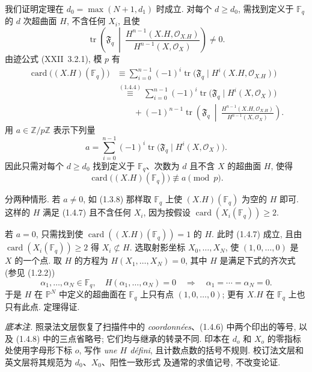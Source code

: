 我们证明定理在 $d_0=\max(N+1,d_1)$ 时成立. 对每个 $d\geq d_0$,
需找到定义于 $\mathbb F_q$ 的 $d$ 次超曲面 $H$, 不含任何 $X_i$, 且使
\begin{equation}\tag{1.4.5}
\operatorname{tr}\!\left(\mathfrak F_q\ \middle|\
\frac{H^{n-1}(X.H,\mathcal O_{X.H})}
     {H^{n-1}(X,\mathcal O_X)}\right)\ne0.
\end{equation}
由迹公式 (XXII~3.2.1), 模 $p$ 有
\begin{equation}\tag{1.4.6}
\begin{aligned}
\operatorname{card}\bigl((X.H)(\mathbb F_q)\bigr)
&\equiv\sum_{i=0}^{n-1}(-1)^i
 \operatorname{tr}\bigl(\mathfrak F_q\mid
 H^i(X.H,\mathcal O_{X.H})\bigr)\\
&\stackrel{(1.4.4)}{\equiv}
 \sum_{i=0}^{n-1}(-1)^i
 \operatorname{tr}\bigl(\mathfrak F_q\mid H^i(X,\mathcal O_X)\bigr)\\
&\qquad+(-1)^{n-1}\operatorname{tr}\!\left(\mathfrak F_q\ \middle|\
 \frac{H^{n-1}(X.H,\mathcal O_{X.H})}
      {H^{n-1}(X,\mathcal O_X)}\right).
\end{aligned}
\end{equation}
用 $a\in\mathbb Z/p\mathbb Z$ 表示下列量
\[
a=\sum_{i=0}^{n-1}(-1)^i
\operatorname{tr}\bigl(\mathfrak F_q\mid H^i(X,\mathcal O_X)\bigr).
\]
因此只需对每个 $d\geq d_0$ 找到定义于 $\mathbb F_q$、次数为 $d$ 且不含 $X$
的超曲面 $H$, 使得
\begin{equation}\tag{1.4.7}
\operatorname{card}\bigl((X.H)(\mathbb F_q)\bigr)\not\equiv a\pmod p.
\end{equation}

分两种情形. 若 $a\ne0$, 如 (1.3.8) 那样取 $\mathbb F_q$ 上使
$(X.H)(\mathbb F_q)$ 为空的 $H$ 即可. 这样的 $H$ 满足 (1.4.7) 且不含任何 $X_i$,
因为按假设 $\operatorname{card}(X_i(\mathbb F_q))\geq2$.

若 $a=0$, 只需找到使 $\operatorname{card}((X.H)(\mathbb F_q))=1$ 的 $H$.
此时 (1.4.7) 成立, 且由 $\operatorname{card}(X_i(\mathbb F_q))\geq2$ 得
$X_i\not\subset H$. 选取射影坐标 $X_0,\dots,X_N$, 使 $(1,0,\dots,0)$ 是 $X$ 的一个点.
取 $H$ 的方程为 $H(X_1,\dots,X_N)=0$, 其中 $H$ 是满足下式的齐次式 (参见 (1.2.2))
\begin{equation}\tag{1.4.8}
\alpha_1,\dots,\alpha_N\in\mathbb F_q,\quad
H(\alpha_1,\dots,\alpha_N)=0
\quad\Longrightarrow\quad
\alpha_1=\cdots=\alpha_N=0.
\end{equation}
于是 $H$ 在 $\mathbb P^N$ 中定义的超曲面在 $\mathbb F_q$ 上只有点 $(1,0,\dots,0)$;
更有 $X.H$ 在 $\mathbb F_q$ 上也只有此点. 定理得证.

\medskip
\noindent\emph{底本注.}
照录法文层恢复了扫描件中的 \emph{coordonnées}、(1.4.6) 中两个印出的等号,
以及 (1.4.8) 中的三点省略号; 它们均与继承的转录不同.
印本在 $d_o$ 和 $X_o$ 的零指标处使用字母形下标 $o$, 写作 \emph{une $H$ défini},
且计数点数的括号不规则. 校订法文层和英文层将其规范为 $d_0$、$X_0$、阳性一致形式
及通常的求值记号, 不改变论证.
